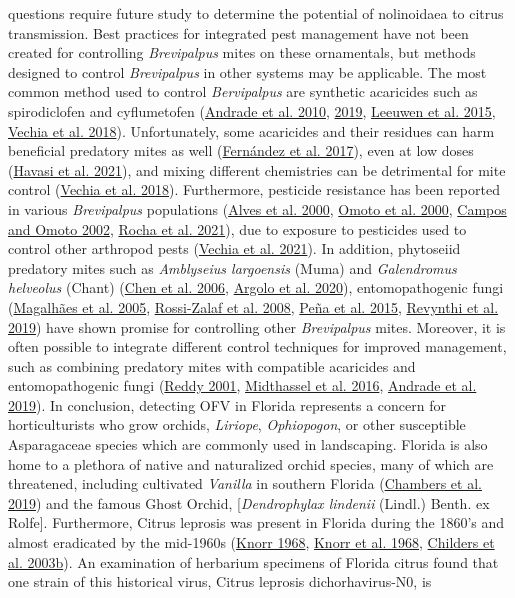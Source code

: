 \documentclass[12pt,final,CPage]{ufthesis}
\begin{document}
{questions require future study to determine the potential of nolinoidaea to citrus transmission. Best practices for integrated pest management have not been created for controlling \emph{Brevipalpus} mites on these ornamentals, but methods designed to control \emph{Brevipalpus} in other systems may be applicable. The most common method used to control \emph{Bervipalpus} are synthetic acaricides such as spirodiclofen and cyflumetofen (\protect\hyperlink{ref-Andrade2010}{Andrade et al. 2010}, \protect\hyperlink{ref-Andrade2019}{2019}, \protect\hyperlink{ref-Leeuwen2015}{Leeuwen et al. 2015}, \protect\hyperlink{ref-Vechia2018}{Vechia et al. 2018}). Unfortunately, some acaricides and their residues can harm beneficial predatory mites as well (\protect\hyperlink{ref-Fernandez2017}{Fernández et al. 2017}), even at low doses (\protect\hyperlink{ref-Havasi2021}{Havasi et al. 2021}), and mixing different chemistries can be detrimental for mite control (\protect\hyperlink{ref-Vechia2018}{Vechia et al. 2018}). Furthermore, pesticide resistance has been reported in various \emph{Brevipalpus} populations (\protect\hyperlink{ref-Alves2000}{Alves et al. 2000}, \protect\hyperlink{ref-Omoto2000}{Omoto et al. 2000}, \protect\hyperlink{ref-Campos2002}{Campos and Omoto 2002}, \protect\hyperlink{ref-Rocha2021}{Rocha et al. 2021}), due to exposure to pesticides used to control other arthropod pests (\protect\hyperlink{ref-Vechia2021}{Vechia et al. 2021}). In addition, phytoseiid predatory mites such as \emph{Amblyseius largoensis} (Muma) and \emph{Galendromus helveolus} (Chant) (\protect\hyperlink{ref-Chen2006}{Chen et al. 2006}, \protect\hyperlink{ref-Argolo2020}{Argolo et al. 2020}), entomopathogenic fungi (\protect\hyperlink{ref-Magalhaes2005}{Magalhães et al. 2005}, \protect\hyperlink{ref-RossiZalaf2008}{Rossi-Zalaf et al. 2008}, \protect\hyperlink{ref-Pena2015}{Peña et al. 2015}, \protect\hyperlink{ref-Revynthi2019}{Revynthi et al. 2019}) have shown promise for controlling other \emph{Brevipalpus} mites. Moreover, it is often possible to integrate different control techniques for improved management, such as combining predatory mites with compatible acaricides and entomopathogenic fungi (\protect\hyperlink{ref-Reddy2001}{Reddy 2001}, \protect\hyperlink{ref-Midthassel2016}{Midthassel et al. 2016}, \protect\hyperlink{ref-Andrade2019}{Andrade et al. 2019}). In conclusion, detecting OFV in Florida represents a concern for horticulturists who grow orchids, \emph{Liriope}, \emph{Ophiopogon}, or other susceptible Asparagaceae species which are commonly used in landscaping. Florida is also home to a plethora of native and naturalized orchid species, many of which are threatened, including cultivated \emph{Vanilla} in southern Florida (\protect\hyperlink{ref-Chambers2019}{Chambers et al. 2019}) and the famous Ghost Orchid, {[}\emph{Dendrophylax lindenii} (Lindl.) Benth. ex Rolfe{]}. Furthermore, Citrus leprosis was present in Florida during the 1860's and almost eradicated by the mid-1960s (\protect\hyperlink{ref-Knorr1968a}{Knorr 1968}, \protect\hyperlink{ref-Knorr1968b}{Knorr et al. 1968}, \protect\hyperlink{ref-Childers2003}{Childers et al. 2003b}). An examination of herbarium specimens of Florida citrus found that one strain of this historical virus, Citrus leprosis dichorhavirus-N0, is }
\end{document}
